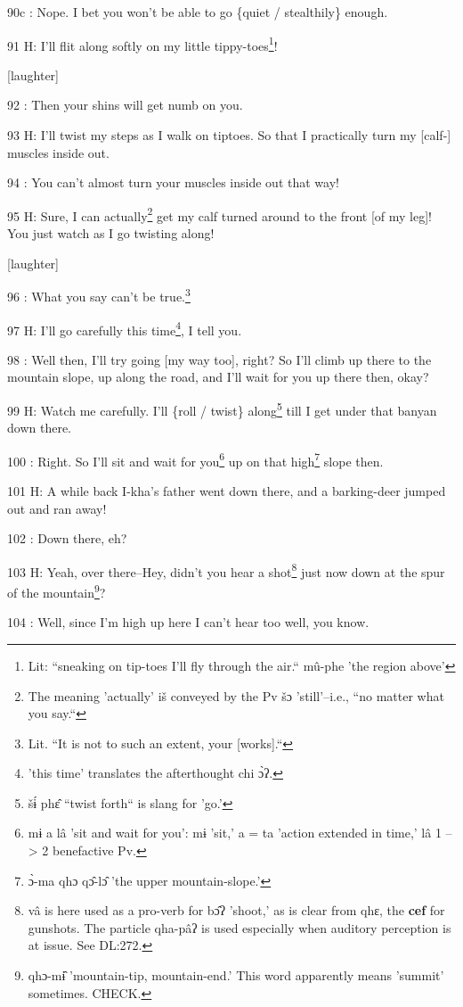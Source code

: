 90c  : Nope. I bet you won't be able to go \{quiet / stealthily\} enough.

91 H: I'll flit along softly on my little tippy-toes\footnote{Lit: ``sneaking on tip-toes I'll fly through the air.`` mû-phe 'the region above'}!

[laughter]

92  : Then your shins will get numb on you.

93 H: I'll twist my steps as I walk on tiptoes. So that I practically turn my [calf-]
muscles inside out.

94  : You can't almost turn your muscles inside out that way!

95 H: Sure, I can actually\footnote{The meaning 'actually' iš conveyed by the Pv šɔ 'still'--i.e., ``no matter what you say.``} get my calf turned around to the front [of my leg]!
You just watch as I go twisting along!

[laughter]

96  : What you say can't be true.\footnote{Lit. ``It is not to such an extent, your [works].``}

97 H: I'll go carefully this time\footnote{'this time' translates the afterthought chi ɔ̀ʔ.}, I tell you.

98  : Well then, I'll try going [my way too], right? So I'll climb up there to
the mountain slope, up along the road, and I'll wait for you up there then, okay?

99 H: Watch me carefully. I'll \{roll / twist\} along\footnote{šɨ́ phɛ̂ ``twist forth`` is slang for 'go.'} till I get under that
banyan down there.

100  : Right. So I'll sit and wait for you\footnote{mɨ a lâ 'sit and wait for you': mɨ 'sit,' a = ta 'action extended in time,' lâ 1 --> 2 benefactive Pv.} up on that high\footnote{ɔ̀-ma qhɔ qɔ̂-lɔ̂ 'the upper mountain-slope.'} slope then.

101 H: A while back I-kha's father went down there, and a barking-deer jumped out
and ran away!

102  : Down there, eh?

103 H: Yeah, over there--Hey, didn't you hear a shot\footnote{vâ is here used as a pro-verb for bɔ̂ʔ 'shoot,' as is clear from qhɛ, the \textbf{cef }for gunshots. The particle qha-pâʔ is used especially when auditory perception is at issue. See DL:272.} just now down at the spur
of the mountain\footnote{qhɔ-mɨ̂ 'mountain-tip, mountain-end.' This word apparently means 'summit' sometimes. CHECK.}?

104  : Well, since I'm high up here I can't hear too well, you know.

